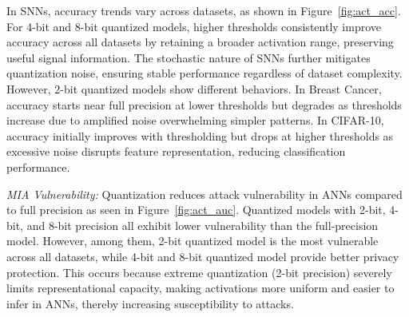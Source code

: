 In SNNs, accuracy trends vary across datasets, as shown in Figure~\ref{fig:act_acc}. For 4-bit and 8-bit quantized models, higher thresholds consistently improve accuracy across all datasets by retaining a broader activation range, preserving useful signal information. The stochastic nature of SNNs further mitigates quantization noise, ensuring stable performance regardless of dataset complexity. However, 2-bit quantized models show different behaviors. In Breast Cancer, accuracy starts near full precision at lower thresholds but degrades as thresholds increase due to amplified noise overwhelming simpler patterns. In CIFAR-10, accuracy initially improves with thresholding but drops at higher thresholds as excessive noise disrupts feature representation, reducing classification performance.


\textit{MIA Vulnerability: }Quantization reduces attack vulnerability in ANNs compared to full precision as seen in Figure~\ref{fig:act_auc}. Quantized models with 2-bit, 4-bit, and 8-bit precision all exhibit lower vulnerability than the full-precision model. However, among them, 2-bit quantized model is the most vulnerable across all datasets, while  4-bit and 8-bit quantized model provide better privacy protection.  This occurs because extreme quantization (2-bit precision) severely limits representational capacity, making activations more uniform and easier to infer in ANNs, thereby increasing susceptibility to attacks. 


